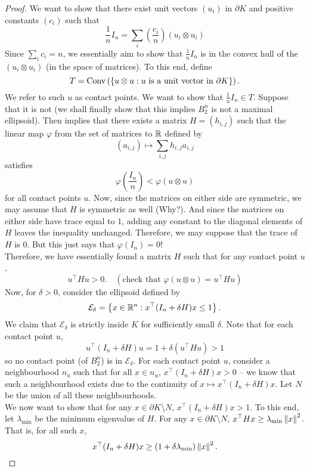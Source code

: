 \begin{proof}
We want to show that there exist unit vectors $(u_i)$ in $\partial{K}$ and positive constants $(c_i)$ such that
\[ \frac{1}{n}I_n = \sum_i \left(\frac{c_i}{n}\right) (u_i\otimes u_i) \]
Since $\sum_i c_i = n$, we essentially aim to show that $\frac{1}{n}I_n$ is in the convex hull of the $(u_i\otimes u_i)$ (in the space of matrices). To this end, define
\[ T = \operatorname{Conv}\left(\{u\otimes u : u\text{ is a unit vector in }\partial K\}\right). \]
We refer to such $u$ as contact points. We want to show that $\frac{1}{n}I_n \in T$. Suppose that it is not (we shall finally show that this implies $B_2^n$ is not a maximal ellipsoid). Then  implies that there exists a matrix $H=(h_{i,j})$ such that the linear map $\varphi$ from the set of matrices to $\mathbb{R}$ defined by
\[ (a_{i,j}) \mapsto \sum_{i,j} h_{i,j} a_{i,j}\]
satisfies
\[ \varphi\left(\frac{I_n}{n}\right) < \varphi(u\otimes u) \]
for all contact points $u$. Now, since the matrices on either side are symmetric, we may assume that $H$ is symmetric as well (Why?). And since the matrices on either side have trace equal to $1$, adding any constant to the diagonal elements of $H$ leaves the inequality unchanged. Therefore, we may suppose that the trace of $H$ is $0$. But this just says that $\varphi(I_n)=0$!\\
Therefore, we have essentially found a matrix $H$ such that for any contact point $u$,
\[ u^\top H u > 0. \quad (\text{check that }\varphi(u\otimes u) = u^\top H u) \]
Now, for $\delta>0$, consider the ellipsoid defined by
\[ \mathcal{E}_\delta = \left\{ x\in\mathbb{R}^n: x^\top(I_n + \delta H)x \leq 1 \right\}. \]
We claim that $\mathcal{E}_\delta$ is strictly inside $K$ for sufficiently small $\delta$. Note that for each contact point $u$,
\[ u^\top (I_n+\delta H) u = 1 + \delta\left(u^\top H u\right) > 1 \]
so no contact point (of $B_2^n$) is in $\mathcal{E}_\delta$. For each contact point $u$, consider a neighbourhood $n_u$ such that for all $x\in n_u$, $x^\top (I_n + \delta H) x > 0$ -- we know that such a neighbourhood exists due to the continuity of $x\mapsto x^\top (I_n + \delta H) x$. Let $N$ be the union of all these neighbourhoods.\\
We now want to show that for any $x\in \partial K\setminus N$, $x^\top (I_n + \delta H) x > 1$.
To this end, let $\lambda_{\min}$ be the minimum eigenvalue of $H$. For any $x\in\partial K\setminus N$, $x^\top H x \geq \lambda_{\min} \left\lVert x\right\rVert^2$. That is, for all such $x$,
\[ x^\top (I_n + \delta H) x \geq (1+\delta\lambda_{\min})\left\lVert x\right\rVert^2. \]

\end{proof}
